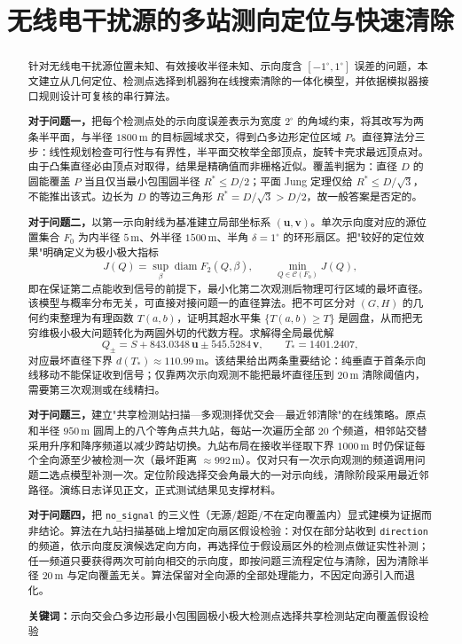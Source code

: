\documentclass[12pt,a4paper]{ctexart}
\title{无线电干扰源的多站测向定位与快速清除}
\author{}
\date{}
\newcommand{\keywords}[1]{\par\noindent\textbf{关键词：}#1}
\newcommand{\diam}{\operatorname{diam}}
\begin{document}
\maketitle

\begin{abstract}
针对无线电干扰源位置未知、有效接收半径未知、示向度含 $[-1^\circ,1^\circ]$ 误差的问题，本文建立从几何定位、检测点选择到机器狗在线搜索清除的一体化模型，并依据模拟器接口规则设计可复核的串行算法。

\textbf{对于问题一，}把每个检测点处的示向度误差表示为宽度 $2^\circ$ 的角域约束，将其改写为两条半平面，与半径 $1800\,\mathrm{m}$ 的目标圆域求交，得到凸多边形定位区域 $P$。直径算法分三步：线性规划检查可行性与有界性，半平面交枚举全部顶点，旋转卡壳求最远顶点对。由于凸集直径必由顶点对取得，结果是精确值而非栅格近似。覆盖判据为：直径 $D$ 的圆能覆盖 $P$ 当且仅当最小包围圆半径 $R^*\le D/2$；平面 Jung 定理仅给 $R^*\le D/\sqrt{3}$，不能推出该式。边长为 $D$ 的等边三角形 $R^*=D/\sqrt{3}>D/2$，故一般答案是否定的。

\textbf{对于问题二，}以第一示向射线为基准建立局部坐标系 $(\bm u,\bm v)$。单次示向度对应的源位置集合 $F_0$ 为内半径 $5\,\mathrm{m}$、外半径 $1500\,\mathrm{m}$、半角 $\delta=1^\circ$ 的环形扇区。把"较好的定位效果"明确定义为极小极大指标
\[
  J(Q)=\sup_{\beta}\diam F_2(Q,\beta),\qquad
  \min_{Q\in\mathcal C(F_0)} J(Q),
\]
即在保证第二点能收到信号的前提下，最小化第二次观测后物理可行区域的最坏直径。该模型与概率分布无关，可直接对接问题一的直径算法。把不可区分对 $(G,H)$ 的几何约束整理为有理函数 $T(a,b)$，证明其超水平集 $\{T(a,b)\ge T\}$ 是圆盘，从而把无穷维极小极大问题转化为两圆外切的代数方程。求解得全局最优解
\[
  Q_\pm=S+843.0348\,\bm u\pm545.5284\,\bm v,\qquad T_*=1401.2407,
\]
对应最坏直径下界 $d(T_*)\approx 110.99\,\mathrm{m}$。该结果给出两条重要结论：纯垂直于首条示向线移动不能保证收到信号；仅靠两次示向观测不能把最坏直径压到 $20\,\mathrm{m}$ 清除阈值内，需要第三次观测或在线精扫。

\textbf{对于问题三，}建立"共享检测站扫描—多观测择优交会—最近邻清除"的在线策略。原点和半径 $950\,\mathrm{m}$ 圆周上的八个等角点共九站，每站一次遍历全部 $20$ 个频道，相邻站交替采用升序和降序频道以减少跨站切换。九站布局在接收半径取下界 $1000\,\mathrm{m}$ 时仍保证每个全向源至少被检测一次（最坏距离 $\approx 992\,\mathrm{m}$）。仅对只有一次示向观测的频道调用问题二选点模型补测一次。定位阶段选择交会角最大的一对示向线，清除阶段采用最近邻路径。演练日志详见正文，正式测试结果见支撑材料。

\textbf{对于问题四，}把 \texttt{no\_signal} 的三义性（无源/超距/不在定向覆盖内）显式建模为证据而非结论。算法在九站扫描基础上增加定向扇区假设检验：对仅在部分站收到 \texttt{direction} 的频道，依示向度反演候选定向方向，再选择位于假设扇区外的检测点做证实性补测；任一频道只要获得两次可前向相交的示向度，即按问题三流程定位与清除，因为清除半径 $20\,\mathrm{m}$ 与定向覆盖无关。算法保留对全向源的全部处理能力，不因定向源引入而退化。

\keywords{示向交会\quad 凸多边形\quad 最小包围圆\quad 极小极大检测点选择\quad 共享检测站\quad 定向覆盖假设检验}
\end{abstract}
\end{document}
